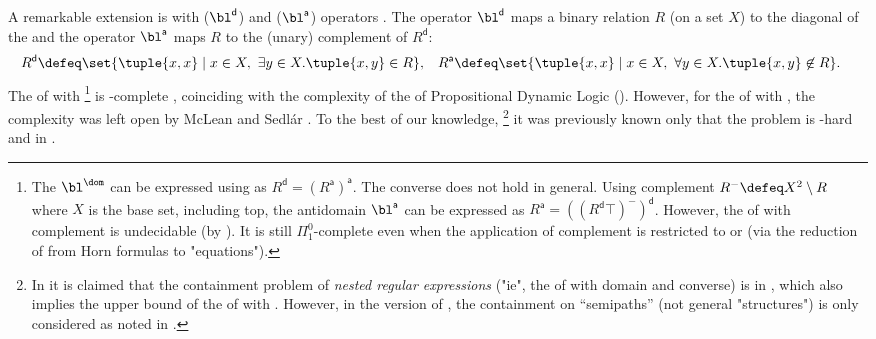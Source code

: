 \begin{scope}
A remarkable extension is  with \reintro*{} ($\bl^{\mathsf{d}}$) and \intro*{} ($\bl^{\mathsf{a}}$) operators \cite{desharnaisKleeneAlgebraDomain2006,desharnaisModalSemiringsRevisited2008,desharnaisInternalAxiomsDomain2011}.
The  operator $\bl^{\mathsf{d}}$ maps a binary relation $R$ (on a set $X$) to the diagonal of the 
and the  operator $\bl^{\mathsf{a}}$ maps $R$ to the (unary) complement of $R^{\mathsf{d}}$:
\begin{align*}
  R^{\mathsf{d}} &\defeq \set{ \tuple{x,x} \mid x \in X,~ \exists y \in X. \tuple{x,y} \in R}, &
  R^{\mathsf{a}} &\defeq \set{ \tuple{x,x} \mid x \in X,~ \forall y \in X. \tuple{x,y} \not\in R}.
\end{align*}
%
The  of  with %
\footnote{\label{footnote: undecidable}%
The  $\bl^{\dom}$ can be expressed using  as $R^{\mathsf{d}} = (R^{\mathsf{a}})^{\mathsf{a}}$.
The converse does not hold in general.
Using complement $R^{-} \defeq X^2 \setminus R$ where $X$ is the base set, including top,
the antidomain $\bl^{\mathsf{a}}$ can be expressed as $R^{\mathsf{a}} = ((R^{\mathsf{d}} \top)^{-})^{\mathsf{d}}$.
However, the  of  with complement is undecidable (by \cite{hardinComplexityHornTheory2003}).
It is still $\Pi^{0}_{1}$-complete even when the application of complement is restricted to  \cite[Corollary 7.2]{nakamuraUndecidabilityEmptinessProblem2025} or  \cite[Theorem 50]{nakamuraExistentialCalculiRelations2023} (via the reduction of \cite[Example 3.4]{nakamuraUndecidabilityEmptinessProblem2025} from Horn formulas to "equations").}
is -complete \cite{sedlarComplexityKleeneAlgebra2023},
coinciding with the complexity of the  of Propositional Dynamic Logic ().
However, for the  of  with , the complexity was left open by McLean \cite[Problem 7.3]{mcleanFreeKleeneAlgebras2020} and Sedl{\'a}r \cite[p.~16]{sedlarKleeneAlgebraDynamic2023}.
To the best of our knowledge,%
\footnote{In \cite[unpublished manuscript]{reutterContainmentNestedRegular2013} 
it is claimed that the containment problem of \emph{nested regular expressions} \cite{perezNSPARQLNavigationalLanguage2008} ("ie", the  of  with domain and converse) is in ,
which also implies the  upper bound of the  of  with .
However, in the version of \cite{reutterContainmentNestedRegular2013}, the containment on ``semipaths'' (not general "structures") is only considered as noted in \cite[p.~1]{reutterContainmentNestedRegular2013}.}
it was previously known only that the problem is -hard \cite{meyerEquivalenceProblemRegular1972} and in  \cite{sedlarComplexityKleeneAlgebra2023}.


\end{scope}
